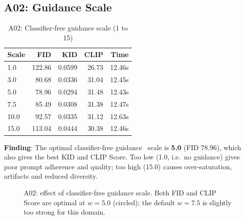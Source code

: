 \documentclass[11pt]{article}
\begin{document}
\subsection{A02: Guidance Scale}

\begin{table}[!htbp]
\centering
\caption{A02: Classifier-free guidance scale (1 to 15)}
\begin{tabular}{lrrrr}
\toprule
Scale & FID & KID & CLIP & Time \\
\midrule
1.0 & 122.86 & 0.0599 & 26.73 & 12.46s \\
3.0 & 80.68 & 0.0336 & 31.04 & 12.45s \\
5.0 & 78.96 & 0.0294 & 31.48 & 12.43s \\
7.5 & 85.49 & 0.0308 & 31.38 & 12.47s \\
10.0 & 92.57 & 0.0335 & 31.12 & 12.63s \\
15.0 & 113.04 & 0.0444 & 30.38 & 12.46s \\
\bottomrule
\end{tabular}
\end{table}

\textbf{Finding}: The optimal classifier-free guidance~\cite{ho2022classifier} scale is \textbf{5.0} (FID 78.96), which also gives the best KID and CLIP Score. Too low (1.0, i.e.\ no guidance) gives poor prompt adherence and quality; too high (15.0) causes over-saturation, artifacts and reduced diversity.

\begin{figure}[!htbp]
\centering
{}
\caption{A02: effect of classifier-free guidance scale. Both FID and CLIP Score are optimal at $w=5.0$ (circled); the default $w=7.5$ is slightly too strong for this domain.}
\label{fig:a02}
\end{figure}
\end{document}
